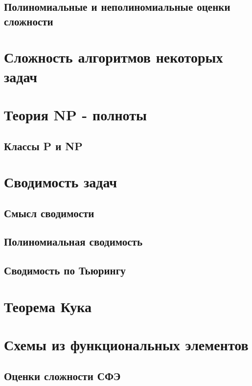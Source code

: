 \subsection{Полиномиальные и неполиномиальные оценки сложности}
\clearpage

\section{Сложность алгоритмов некоторых задач}
\clearpage

\section{Теория NP - полноты}
\clearpage

\subsection{Классы P и NP}
\clearpage

\section{Сводимость задач}
\clearpage

\subsection{Смысл сводимости}
\clearpage

\subsection{Полиномиальная сводимость}
\clearpage

\subsection{Сводимость по Тьюрингу}
\clearpage

\section{Теорема Кука}
\clearpage

\section{Схемы из функциональных элементов}
\clearpage

\subsection{Оценки сложности СФЭ}
\clearpage
	
